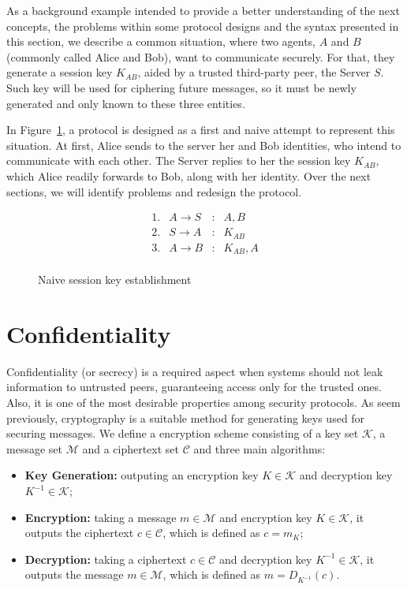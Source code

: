 As a background example intended to provide a better understanding of the next concepts, the problems within some protocol designs and the syntax presented in this section, we describe a common situation, where two agents, \(A\) and \(B\) (commonly called Alice and Bob), want to communicate securely. For that, they generate a session key \(K_{AB}\), aided by a trusted third-party peer, the Server \(S\). Such key will be used for ciphering future messages, so it must be newly generated and only known to these three entities.

In Figure~\ref{prt:naive-session-key}, a protocol is designed as a first and naive attempt to represent this situation. At first, Alice sends to the server her and Bob identities, who intend to communicate with each other. The Server replies to her the session key \(K_{AB}\), which Alice readily forwards to Bob, along with her identity. Over the next sections, we will identify problems and redesign the protocol.

\begin{figure}[ht]
  \centering
  \[
    \begin{array}{rlcl}
      1. & A \longrightarrow S & : & A, B \\
      2. & S \longrightarrow A & : & K_{AB} \\
      3. & A \longrightarrow B & : & K_{AB}, A \\
    \end{array}
  \]
  \caption{Naive session key establishment}
  \label{prt:naive-session-key}
\end{figure}





\section{Confidentiality}
Confidentiality (or secrecy) is a required aspect when systems should not leak information to untrusted peers, guaranteeing access only for the trusted ones. Also, it is one of the most desirable properties among security protocols. As seem previously, cryptography is a suitable method for generating keys used for securing messages. We define a encryption scheme consisting of a key set \(\mathcal{K}\), a message set \(\mathcal{M}\) and a ciphertext set \(\mathcal{C}\) and three main algorithms:

\begin{itemize}
  \item \textbf{Key Generation:} outputing an encryption key \(K \in \mathcal{K}\) and decryption key \(K^{-1} \in \mathcal{K}\);

  \item \textbf{Encryption:} taking a message \(m \in \mathcal{M}\) and encryption key \(K \in \mathcal{K}\), it outputs the ciphertext \(c \in \mathcal{C}\), which is defined as \(c = m_K\);

  \item \textbf{Decryption:} taking a ciphertext \(c \in \mathcal{C}\) and decryption key \(K^{-1} \in \mathcal{K}\), it outputs the message \(m \in \mathcal{M}\), which is defined as \(m = D_{K^{-1}}(c)\).
\end{itemize}

